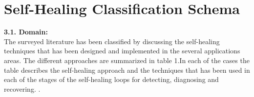 \chapter{Self-Healing Classification Schema} \label{ch:SelfHealingClassificationSchema}



\textbf{3.1. Domain:\\}
The surveyed literature has been classified by discussing the self-healing techniques that has been designed and implemented in the several applications areas. The different approaches are summarized in table 1.In each of the cases the table describes the self-healing approach and the techniques that has been used in each of the stages of the self-healing loops for detecting, diagnosing and recovering.
\cite{Harald:SelfHealingSurvey:2011}.\\

